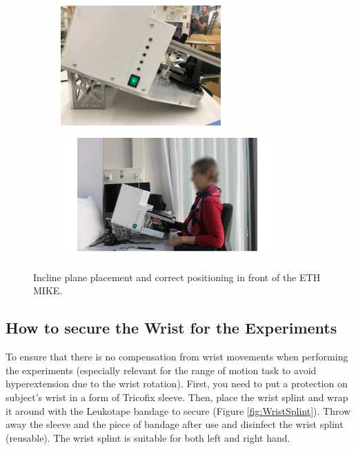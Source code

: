\documentclass[10pt,oneside,a4paper]{article}
\begin{document}
\begin{figure}[h!]
\centering
\begin{subfigure}[b]{0.4\textwidth}
	\includegraphics[height=4.6cm]{images/Hardware/Incline.jpg}
\end{subfigure}
\hfill
\begin{subfigure}[b]{0.58\textwidth}
	\includegraphics[height=4.6cm]{images/Subjects/SubjectsPosition.png}
\end{subfigure}
\caption{Incline plane placement and correct positioning in front of the ETH MIKE.}
\label{fig:incline}
\end{figure}

\subsection{How to secure the Wrist for the Experiments}
To ensure that there is no compensation from wrist movements when performing the experiments (especially relevant for the range of motion task to avoid hyperextension due to the wrist rotation). First, you need to put a protection on subject’s wrist in a form of Tricofix sleeve. Then, place the wrist splint and wrap it around with the Leukotape bandage to secure (Figure \ref{fig:WristSplint}). Throw away the sleeve and the piece of bandage after use and disinfect the wrist splint (reusable). The wrist splint is suitable for both left and right hand. 
\end{document}
